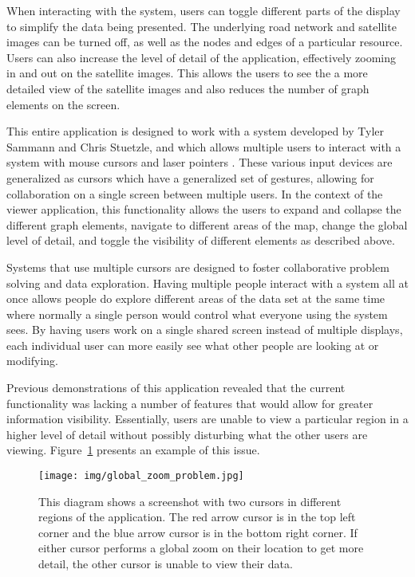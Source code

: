 When interacting with the system, users can toggle different parts of the display to simplify the data being presented. The underlying road network and satellite images can be turned off, as well as the nodes and edges of a particular resource. Users can also increase the level of detail of the application, effectively zooming in and out on the satellite images. This allows the users to see the a more detailed view of the satellite images and also reduces the number of graph elements on the screen. 

This entire application is designed to work with a system developed by Tyler Sammann and Chris Stuetzle, and which allows multiple users to interact with a system with mouse cursors and laser pointers \cite{Sammann2013}. These various input devices are generalized as cursors which have a generalized set of gestures, allowing for collaboration on a single screen between multiple users. In the context of the viewer application, this functionality allows the users to expand and
collapse the different graph elements, navigate to different areas of the map, change the global level of detail, and toggle the visibility of different elements as described above.

Systems that use multiple cursors are designed to foster collaborative problem solving and data exploration. Having multiple people interact with a system all at once allows people do explore different areas of the data set at the same time where normally a single person would control what everyone using the system sees. By having users work on a single shared screen instead of multiple displays, each individual user can more easily see what other people are looking at or
modifying.

Previous demonstrations of this application revealed that the current functionality was lacking a number of features that would allow for greater information visibility. Essentially, users are unable to view a particular region in a higher level of detail without possibly disturbing what the other users are viewing. Figure~\ref{fig:example_problem} presents an example of this issue.

\begin{figure}[htp] \centering
    \texttt{[image: img/global\_zoom\_problem.jpg]}
    \caption[Loss of Context]{This diagram shows a screenshot with two cursors in different regions of the application. The red arrow cursor is in the top left corner and the blue arrow cursor is in the bottom right corner. If either cursor performs a global zoom on their location to get more detail, the other cursor is unable to view their data.}
    \label{fig:example_problem}
\end{figure}

